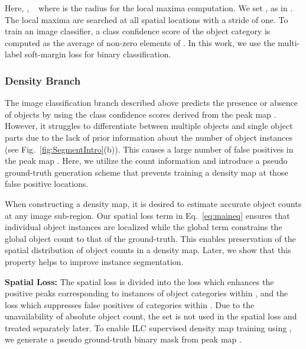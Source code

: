 \documentclass[10pt,twocolumn,letterpaper]{article}
\begin{document}
Here,  , ~   where   is the radius for the local maxima computation. We set , as in \cite{PRM}. The local maxima are searched at all spatial locations with a stride of one. To train an image classifier, a class confidence score  of the  object category is computed as the average of non-zero elements of . In this work, we use the multi-label soft-margin loss \cite{multilabelsoftmargin} for binary classification. 
\vspace{-0.35cm}
\subsubsection{Density Branch}
\label{density} \vspace{-0.15cm}
 The image classification branch described above predicts the presence or absence of objects by using the class confidence scores derived from the peak map . However, it struggles to differentiate between multiple objects and single object parts due to the lack of prior information about the number of object instances (see Fig.~\ref{fig:SegmentIntro}(b)). This causes a large number of false positives in the peak map . Here, we utilize the count information and introduce a pseudo ground-truth generation scheme that prevents training a density map at those false positive locations. 
 
 When constructing a density map, it is desired to estimate accurate object counts at any image sub-region. Our spatial loss term  in Eq.~\ref{eq:maineq} ensures that individual object instances are localized while the global term  constrains the global object count to that of the ground-truth. This enables preservation of the spatial distribution of object counts in a density map. Later, we show that this property helps to improve instance segmentation.
 










 


  \noindent\textbf{Spatial Loss:} The spatial loss   is divided into the loss  which enhances the positive peaks corresponding to instances of object categories within , and the loss  which suppresses false positives of categories within .   
 Due to the unavailability of absolute object count, the set  is not used in the spatial loss and treated separately later. To enable ILC supervised density map training using  , we generate a pseudo ground-truth binary mask from peak map . 
  
\end{document}
